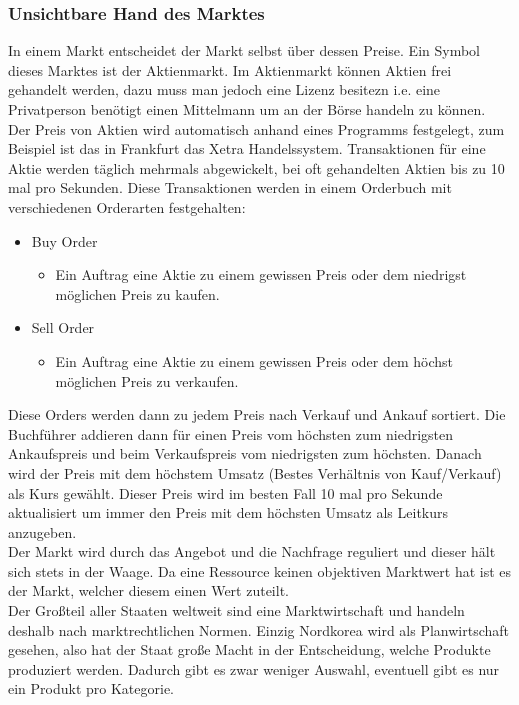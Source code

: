 \documentclass{article}
\begin{document}
	\subsubsection{Unsichtbare Hand des Marktes}
	In einem Markt entscheidet der Markt selbst über dessen Preise. Ein Symbol dieses Marktes ist der Aktienmarkt. Im Aktienmarkt können Aktien frei gehandelt werden, dazu muss man jedoch eine Lizenz besitezn i.e. eine Privatperson benötigt einen Mittelmann um an der Börse handeln zu können. Der Preis von Aktien wird automatisch anhand eines Programms festgelegt, zum Beispiel ist das in Frankfurt das Xetra Handelssystem. Transaktionen für eine Aktie werden täglich mehrmals abgewickelt, bei oft gehandelten Aktien bis zu 10 mal pro Sekunden. Diese Transaktionen werden in einem Orderbuch mit verschiedenen Orderarten festgehalten:
	\begin{itemize}
		\item{Buy Order}
		\begin{itemize}
			\item{Ein Auftrag eine Aktie zu einem gewissen Preis oder dem niedrigst möglichen Preis zu kaufen.}
		\end{itemize}
		\item{Sell Order}
		\begin{itemize}
			\item{Ein Auftrag eine Aktie zu einem gewissen Preis oder dem höchst möglichen Preis zu verkaufen.}
		\end{itemize}
	\end{itemize}
	Diese Orders werden dann zu jedem Preis nach Verkauf und Ankauf sortiert. Die Buchführer addieren dann für einen Preis vom höchsten zum niedrigsten Ankaufspreis und beim Verkaufspreis vom niedrigsten zum höchsten. Danach wird der Preis mit dem höchstem Umsatz (Bestes Verhältnis von Kauf/Verkauf) als Kurs gewählt. Dieser Preis wird im besten Fall 10 mal pro Sekunde aktualisiert um immer den Preis mit dem höchsten Umsatz als Leitkurs anzugeben. \\
	Der Markt wird durch das Angebot und die Nachfrage reguliert und dieser hält sich stets in der Waage. Da eine Ressource keinen objektiven Marktwert hat ist es der Markt, welcher diesem einen Wert zuteilt. \\
	Der Großteil aller Staaten weltweit sind eine Marktwirtschaft und handeln deshalb nach marktrechtlichen Normen. Einzig Nordkorea wird als Planwirtschaft gesehen, also hat der Staat große Macht in der Entscheidung, welche Produkte produziert werden. Dadurch gibt es zwar weniger Auswahl, eventuell gibt es nur ein Produkt pro Kategorie.
\end{document}
